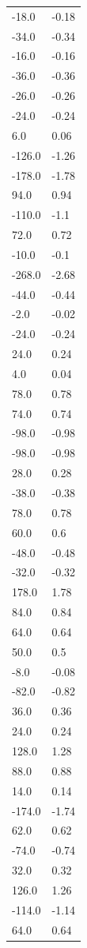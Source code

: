 \begin{longtable}{ll}
-18.0 & -0.18 \\
-34.0 & -0.34 \\
-16.0 & -0.16 \\
-36.0 & -0.36 \\
-26.0 & -0.26 \\
-24.0 & -0.24 \\
6.0 & 0.06 \\
-126.0 & -1.26 \\
-178.0 & -1.78 \\
94.0 & 0.94 \\
-110.0 & -1.1 \\
72.0 & 0.72 \\
-10.0 & -0.1 \\
-268.0 & -2.68 \\
-44.0 & -0.44 \\
-2.0 & -0.02 \\
-24.0 & -0.24 \\
24.0 & 0.24 \\
4.0 & 0.04 \\
78.0 & 0.78 \\
74.0 & 0.74 \\
-98.0 & -0.98 \\
-98.0 & -0.98 \\
28.0 & 0.28 \\
-38.0 & -0.38 \\
78.0 & 0.78 \\
60.0 & 0.6 \\
-48.0 & -0.48 \\
-32.0 & -0.32 \\
178.0 & 1.78 \\
84.0 & 0.84 \\
64.0 & 0.64 \\
50.0 & 0.5 \\
-8.0 & -0.08 \\
-82.0 & -0.82 \\
36.0 & 0.36 \\
24.0 & 0.24 \\
128.0 & 1.28 \\
88.0 & 0.88 \\
14.0 & 0.14 \\
-174.0 & -1.74 \\
62.0 & 0.62 \\
-74.0 & -0.74 \\
32.0 & 0.32 \\
126.0 & 1.26 \\
-114.0 & -1.14 \\
64.0 & 0.64 \\

\end{longtable}
